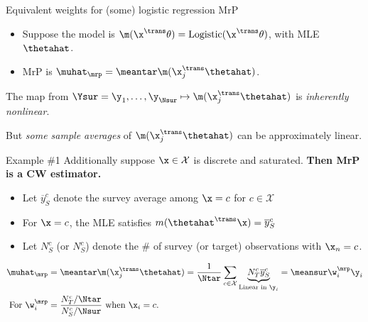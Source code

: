 \begin{frame}[t]{Equivalent weights for (some) logistic regression MrP}
%
\begin{itemize}
    \item Suppose the model is $\m(\x^\trans \theta) = \mathrm{Logistic}(\x^\trans \theta)$, with MLE $\thetahat$.
    \item MrP is $\muhat_\mrp = \meantar \m(\x_j^\trans \thetahat)$.
\end{itemize}

The map from $\Ysur = \y_1, \ldots, \y_{\Nsur} \mapsto \m(\x_j^\trans \thetahat)$ is
\emph{inherently nonlinear}.

But \emph{some sample averages}
of $\m(\x_j^\trans \thetahat)$ can be approximately linear.\pause

\begin{block}{Example \#1}
Additionally suppose $\x \in \mathcal{X}$ is discrete and saturated.
        \textbf{Then MrP is a CW estimator.}
\end{block}

\pause
\def\ybar{\overline{y}}
\def\Ntarc{N_T^c}
\def\Nsurc{N_S^c}
%
\begin{itemize}
    \item Let $\ybar_S^c$ denote the survey average among $\x = c$ for $c \in \mathcal{X}$\pause
    \item For $\x = c$, the MLE satisfies $m(\thetahat^\trans \x) = \ybar_S^c$\pause
    \item Let $\Nsurc$ (or $\Nsurc$) denote the \# of survey (or target) observations with $\x_n = c$.\pause
\end{itemize}
%
$$
\begin{aligned}
\muhat_\mrp ={}& \meantar \m(\x_j^\trans \thetahat)
            = \frac{1}{\Ntar} \sum_{c \in \mathcal{X}}
            \underbrace{\Ntarc \ybar_S^c}_{\textrm{Linear in }\y_i}
        = \meansur \w_i^\mrp \y_i
\\ \textrm{For }
\w_i^\mrp ={}&
    \frac{\Ntarc / \Ntar}{\Nsurc / \Nsur} \textrm{ when }\x_i=c.
\end{aligned}
$$

\end{frame}



